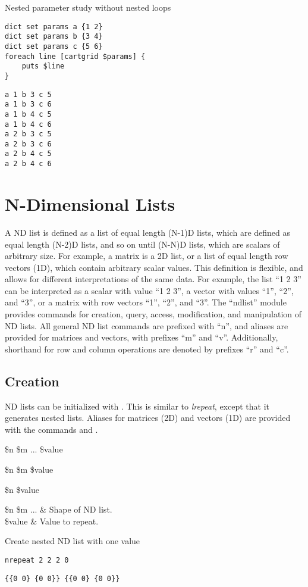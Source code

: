 \begin{example}[label=ex:cartgrid]{Nested parameter study without nested loops}
\begin{lstlisting}
dict set params a {1 2}
dict set params b {3 4}
dict set params c {5 6}
foreach line [cartgrid $params] {
    puts $line
}
\end{lstlisting}
\tcblower
\begin{lstlisting}
a 1 b 3 c 5
a 1 b 3 c 6
a 1 b 4 c 5
a 1 b 4 c 6
a 2 b 3 c 5
a 2 b 3 c 6
a 2 b 4 c 5
a 2 b 4 c 6
\end{lstlisting}
\end{example}
\clearpage
\section{N-Dimensional Lists}
A ND list is defined as a list of equal length (N-1)D lists, which are defined as equal length (N-2)D lists, and so on until (N-N)D lists, which are scalars of arbitrary size.
For example, a matrix is a 2D list, or a list of equal length row vectors (1D), which contain arbitrary scalar values.
This definition is flexible, and allows for different interpretations of the same data. For example, the list ``1 2 3'' can be interpreted as a scalar with value ``1 2 3'', a vector with values ``1'', ``2'', and ``3'', or a matrix with row vectors ``1'', ``2'', and ``3''.
The ``ndlist'' module provides commands for creation, query, access, modification, and manipulation of ND lists. 
All general ND list commands are prefixed with ``n'', and aliases are provided for matrices and vectors, with prefixes ``m'' and ``v''. Additionally, shorthand for row and column operations are denoted by prefixes ``r'' and ``c''.

\subsection{Creation}
ND lists can be initialized with . This is similar to \textit{lrepeat}, except that it generates nested lists. Aliases for matrices (2D) and vectors (1D) are provided with the commands  and .
\begin{syntax}
 \$n \$m ... \$value
\end{syntax}
\begin{syntax}
 \$n \$m \$value
\end{syntax}
\begin{syntax}
 \$n \$value
\end{syntax}
\begin{args}
\$n \$m ... & Shape of ND list. \\
\$value & Value to repeat.
\end{args}
\begin{example}{Create nested ND list with one value}
\begin{lstlisting}
nrepeat 2 2 2 0
\end{lstlisting}
\tcblower
\begin{lstlisting}
{{0 0} {0 0}} {{0 0} {0 0}}
\end{lstlisting}
\end{example}
\clearpage
